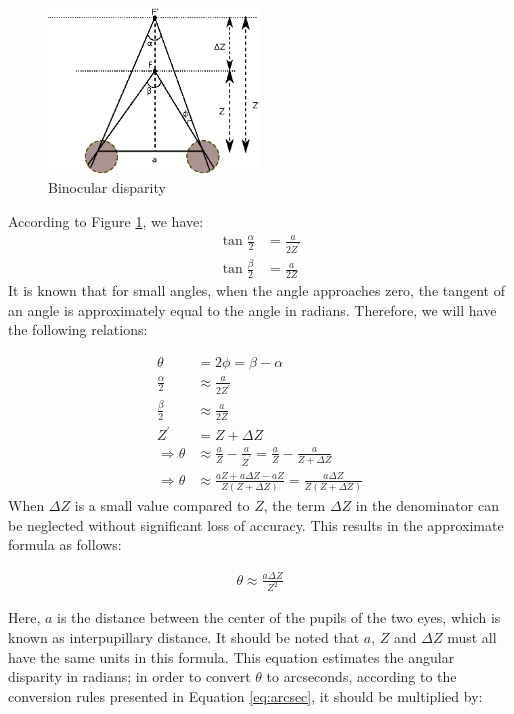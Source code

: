 \begin{figure}[!h]
\centering
\includegraphics[width=0.5\textwidth]{binocular}
\caption{Binocular disparity}
\label{fig:stereopsis}
\end{figure} 

According to Figure \ref{fig:stereopsis}, we have:
\begin{align}
\label{eq:tang}
\tan \frac{\alpha}{2} &= \frac{a}{2Z^{'}}\\
\tan \frac{\beta}{2} &= \frac{a}{2Z}
\end{align}
It is known that for small angles, when the angle approaches zero, the tangent of an angle is approximately equal to the angle in radians. Therefore, we will
have the following relations:

\begin{align}
\theta &= 2\phi = \beta - \alpha\\
\frac{\alpha}{2} &\approx \frac{a}{2Z^{'}}\\
\frac{\beta}{2} &\approx \frac{a}{2Z}\\
Z^{'} &= Z + \Delta Z\\
\Rightarrow \theta &\approx \frac{a}{Z} - \frac{a}{Z^{'}}= \frac{a}{Z} - \frac{a}{Z+\Delta Z} \\
\Rightarrow \theta &\approx \frac{aZ+a\Delta Z-aZ}{Z(Z+\Delta Z)} = \frac{a \Delta Z}{Z(Z+ \Delta Z)}
\end{align}
When $\Delta Z$ is a small value compared to $Z$, the term $\Delta Z$ in the denominator can be neglected without 
significant loss of accuracy. This results in
the approximate formula as follows:

\begin{align}
\label{eq:stac}
\theta \approx \frac{a \Delta Z}{Z^{2}}
\end{align}

Here, $a$ is the distance between the center of the pupils of the two eyes, which is known as interpupillary distance.
It should be noted that $a$, $Z$ and $ \Delta Z$ must all have the same units in this formula. 
This equation estimates the angular disparity in radians; in order to convert $\theta$ to arcseconds, 
according to the conversion rules presented in Equation \ref{eq:arcsec}, it should be multiplied by:

